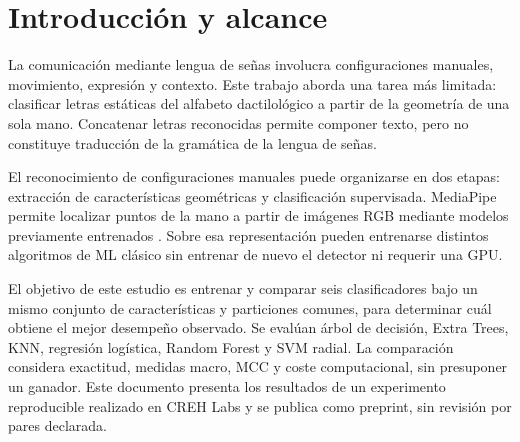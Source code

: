 \documentclass[11pt,a4paper]{article}
\begin{document}

\section{Introducción y alcance}
La comunicación mediante lengua de señas involucra configuraciones manuales, movimiento, expresión y contexto. Este trabajo aborda una tarea más limitada: clasificar letras estáticas del alfabeto dactilológico a partir de la geometría de una sola mano. Concatenar letras reconocidas permite componer texto, pero no constituye traducción de la gramática de la lengua de señas.

El reconocimiento de configuraciones manuales puede organizarse en dos etapas: extracción de características geométricas y clasificación supervisada. MediaPipe permite localizar puntos de la mano a partir de imágenes RGB mediante modelos previamente entrenados \cite{zhang}. Sobre esa representación pueden entrenarse distintos algoritmos de ML clásico sin entrenar de nuevo el detector ni requerir una GPU.

El objetivo de este estudio es entrenar y comparar seis clasificadores bajo un mismo conjunto de características y particiones comunes, para determinar cuál obtiene el mejor desempeño observado. Se evalúan árbol de decisión, Extra Trees, KNN, regresión logística, Random Forest y SVM radial. La comparación considera exactitud, medidas macro, MCC y coste computacional, sin presuponer un ganador. Este documento presenta los resultados de un experimento reproducible realizado en CREH Labs y se publica como preprint, sin revisión por pares declarada.
\end{document}
